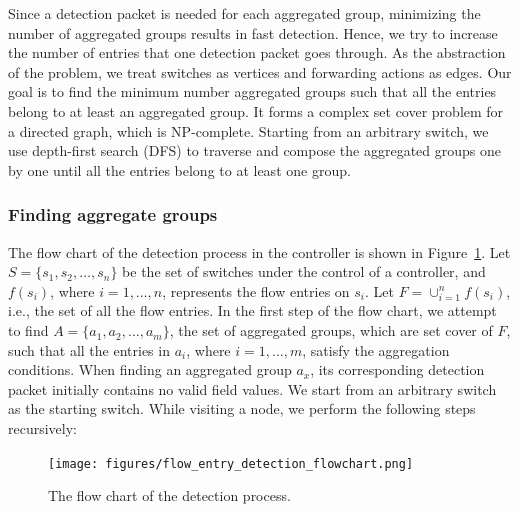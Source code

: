 \documentclass[conference]{IEEEtran}
\begin{document}
\setlength{\textfloatsep}{4pt}
\setlength{\floatsep}{4pt}
\setlength{\intextsep}{3pt}
\setlength{\dbltextfloatsep}{4pt}
\setlength{\dblfloatsep}{4pt}

Since a detection packet is needed for each aggregated group, minimizing the number of aggregated groups results in fast detection. Hence, we try to increase the number of entries that one detection packet goes through. As the abstraction of the problem, we treat switches as vertices and forwarding actions as edges. Our goal is to find the minimum number aggregated groups such that all the entries belong to at least an aggregated group. It forms a complex set cover problem for a directed graph, which is NP-complete. Starting from an arbitrary switch, we use depth-first search (DFS) to traverse and compose the aggregated groups one by one until all the entries belong to at least one group. 

\subsubsection{Finding aggregate groups}
\label{Aggregated_group_finding}

The flow chart of the detection process in the controller is shown in Figure~\ref{flow_entry_detection_flowchart}. Let $S=\{s_1,s_2,\ldots,s_n\}$ be the set of switches under the control of a controller, and $f(s_i)$, where $i=1,\ldots,n$, represents the flow entries on $s_i$. Let $F=\cup_{i=1}^n f(s_i)$, i.e., the set of all the flow entries. In the first step of the flow chart, we attempt to find $A=\{a_1, a_2, \ldots, a_m\}$, the set of aggregated groups, which are set cover of $F$, such that all the entries in $a_i$, where $i=1,\ldots,m$, satisfy the aggregation conditions. When finding an aggregated group $a_x$, its corresponding detection packet initially contains no valid field values. We start from an arbitrary switch as the starting switch. While visiting a node, we perform the following steps recursively:

\begin{figure}[ht]
\centering
\texttt{[image: figures/flow\_entry\_detection\_flowchart.png]}
\caption{The flow chart of the detection process.}
\label{flow_entry_detection_flowchart}
\end{figure}
\end{document}
